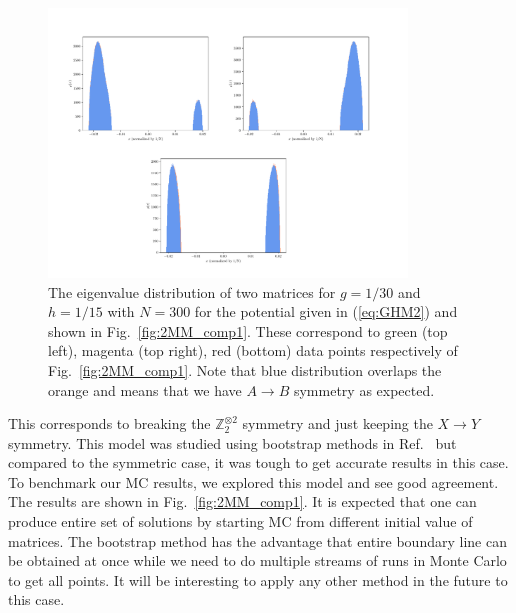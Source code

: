 \documentclass[11pt]{article}
\begin{document}
\begin{figure}[htbp] 
	\centering 
	\includegraphics[width=0.85\textwidth]{figs/all_symb_ev.pdf}
	\caption{\label{fig:2MM_evd}The eigenvalue distribution of two matrices for $g=1/30$ and $h=1/15$ 
	with $N=300$ for the potential given in (\ref{eq:GHM2}) and shown in Fig.~\ref{fig:2MM_comp1}.
	These correspond to green (top left), magenta (top right), red (bottom) data points respectively of Fig.~\ref{fig:2MM_comp1}.
	Note that blue distribution overlaps the orange and means that we have $A \to B$ symmetry as expected.}
\end{figure}
This corresponds to breaking the $\mathbb{Z}_{2}^{\otimes 2}$ symmetry and just keeping the $X \to Y$ symmetry. This model was studied using bootstrap methods in 
Ref.~\cite{Kazakov:2021lel} but compared to the symmetric case, it was tough to get accurate results in this case. 
To benchmark our MC results, we explored this model
and see good agreement. The results are shown in Fig.~\ref{fig:2MM_comp1}. It is expected that one can produce entire set of solutions by starting MC from different initial value of matrices. The bootstrap method has the advantage that entire boundary line can be obtained at once while we need to do multiple streams of runs in Monte Carlo to get all points. It will be interesting to apply any other method in the future to this case.   
\end{document}
